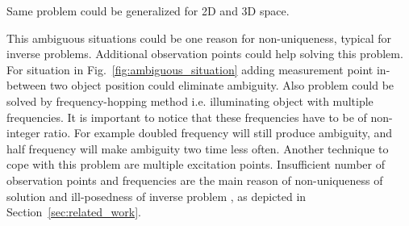 \documentclass[conference]{IEEEtran}
\begin{document}
\par
Same problem could be generalized for 2D and 3D space.


\par
This ambiguous situations could be one reason for non-uniqueness,
typical for inverse problems.
Additional observation points could help solving this problem.
For situation in Fig.~\ref{fig:ambiguous_situation} adding measurement point
in-between two object position could eliminate ambiguity.
Also problem could be solved by frequency-hopping method \cite{FrequencyHopping} i.e. 
illuminating object with multiple frequencies. 
It is important to notice that these frequencies have to be of non-integer ratio.
For example doubled frequency will still produce ambiguity,
and half frequency will make ambiguity two time less often.
Another technique to cope with this problem are multiple excitation points.
Insufficient number of observation points and frequencies
are the main reason of non-uniqueness of solution
and ill-posedness of inverse problem \cite{ManitobaColinGilmorePhD},
as depicted in Section~\ref{sec:related_work}.
\end{document}

